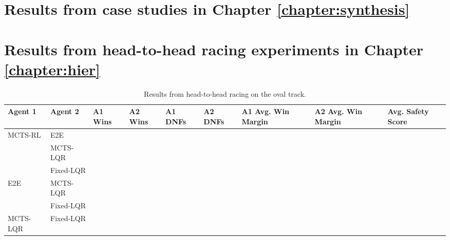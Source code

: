 \section{Results from case studies in Chapter \ref{chapter:synthesis}}

\section{Results from head-to-head racing experiments in Chapter \ref{chapter:hier}} \label{app:hier_results}
\begin{table} [H]
\centering
\begin{tabular}{@{}lllllllll@{}} 
\toprule
Agent 1  & Agent 2   & A1 Wins & A2 Wins & A1 DNFs & A2 DNFs & A1 Avg. Win Margin & A2 Avg. Win Margin & Avg. Safety Score\\ \midrule
MCTS-RL  & E2E       &         &         &         &         &                  &   &               \\
         & MCTS-LQR  &         &         &         &         &                  &   &               \\
         & Fixed-LQR &         &         &         &         &                  &   &               \\
E2E      & MCTS-LQR  &         &         &         &         &                  &    &              \\
         & Fixed-LQR &         &         &         &         &                  &   &               \\
MCTS-LQR & Fixed-LQR &         &         &         &         &                  &    &              \\ \bottomrule
\end{tabular}
\vspace{1 mm}
\caption{Results from head-to-head racing on the oval track.}
 \label{tab:results_oval}
\end{table}

